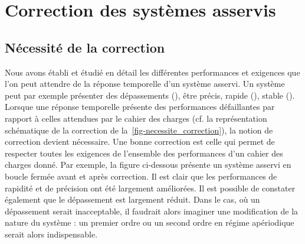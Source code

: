 \chapter{Correction des systèmes asservis\label{chap-correc}}
\minitoc
\newpage
\section{Nécessité de la correction}
Nous avons établi et étudié en détail les différentes performances et 
exigences que l'on peut attendre de la réponse temporelle d'un système asservi.
Un système peut par exemple présenter des dépassements 
(), être précis, rapide (), stable 
(). Lorsque une réponse temporelle présente des performances
défaillantes par rapport à celles attendues par le cahier des charges (cf. 
la représentation schématique de la correction de 
la~\cref{fig-necessite_correction}), la notion de correction devient 
nécessaire. Une bonne correction est celle qui permet de respecter toutes
les exigences de l'ensemble des performances d'un cahier des charges donné. 
Par exemple, la figure ci-dessous présente un système asservi 
en boucle fermée avant et après correction. Il est clair que les performances
de rapidité et de précision ont été largement améliorées. Il est possible de 
constater également que le dépassement est largement réduit. Dans le cas, 
où un dépassement serait inacceptable, il faudrait alors imaginer une 
modification de la nature du système : un premier ordre ou un second ordre
en régime apériodique serait alors indispensable.

